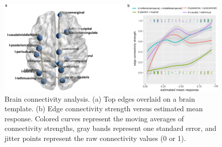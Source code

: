 \documentclass[aos]{imsart}
\theoremstyle{definition}
\def\CNN{\text{\bf \footnotesize CNN }}
\begin{document}
\begin{table}[t!]
\caption{Brain connectivity analysis. (a) Comparison of prediction accuracy measured by AUC, with standard errors over 5-fold cross validation in the parentheses. For \CNN, there is no report for node selection. (b) Top edges selected by the method {\footnotesize \bf ASSIST-p}. The letters ``r'' and ``l'' in node names indicate the right and left hemisphere, respectively. The $p$-value is calculated from the two-sample test of edge connection strength between two individual groups. }
\label{fig:real}
\end{table}

\begin{figure}[b!]
\centering
\includegraphics[width=.8\textwidth]{figure/brain.pdf}
\caption{Brain connectivity analysis.  (a) Top edges overlaid on a brain template. (b) Edge connectivity strength versus estimated mean response. Colored curves represent the moving averages of connectivity strengths, gray bands represent one standard error, and jitter points represent the raw connectivity values (0 or 1).}
\label{fig:real2}
\end{figure}
\end{document}
